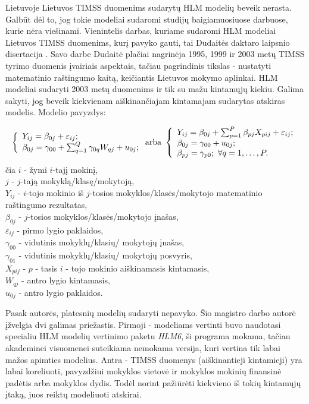\documentclass[11pt,a4paper]{article}
\begin{document}
\indent Lietuvoje Lietuvos TIMSS duomenims sudarytų HLM modelių beveik nerasta. Galbūt dėl to, jog tokie modeliai sudaromi studijų baigiamuosiuose darbuose, kurie nėra viešinami. Vienintelis darbas, kuriame sudaromi HLM modeliai Lietuvos TIMSS duomenims, kurį pavyko gauti, tai Dudaitės daktaro laipsnio disertacija \cite{liet2003}. Savo darbe Dudaitė plačiai nagrinėja 1995, 1999 ir 2003 metų TIMSS tyrimo duomenis įvairiais aspektais, tačiau pagrindinis tikslas - nustatyti matematinio raštingumo kaitą, keičiantis Lietuvos mokymo aplinkai. HLM modeliai sudaryti 2003 metų duomenims ir tik su mažu kintamųjų kiekiu. Galima sakyti, jog beveik kiekvienam aiškinančiajam kintamajam sudarytas atskiras modelis. Modelio pavyzdys:
\begin{small}
\[
\left\{
\begin{array}{l l}
Y_{ij} = \beta_{0j}+\varepsilon_{ij}; \\
\beta_{0j} = \gamma_{00} + \sum^Q_{q=1}\gamma_{0q}W_{qj}+u_{0j};
\end{array} \right.
\text{arba}\
\left\{
\begin{array}{l l}
Y_{ij} = \beta_{0j}+\sum^P_{p=1}\beta_{pj}X_{pij}+\varepsilon_{ij}; \\
\beta_{0j} = \gamma_{00} + u_{0j};\\
\beta_{pj} = \gamma_{p0}; \ \forall q=1,\dots,P.
\end{array} \right.
\]
čia $i$ - žymi $i$-tajį mokinį,\\
$j$ - $j$-tają mokyklą/klasę/mokytoją,\\
$Y_{ij}$ - $i$-tojo mokinio iš $j$-tosios mokyklos/klasės/mokytojo matematinio raštingumo rezultatas,\\
$\beta_{0j}$ - $j$-tosios mokyklos/klasės/mokytojo įnašas,\\
$\varepsilon_{ij}$ - pirmo lygio paklaidos,\\
$\gamma_{00}$ - vidutinis mokyklų/klasių/ mokytojų įnašas,\\
$\gamma_{01}$ - vidutinis mokyklų/klasių/ mokytojų posvyris,\\
$X_{pij}$ - $p$ - tasis $i$ - tojo mokinio aiškinamasis kintamasis,\\
$W_{qj}$ - antro lygio kintamasis, \\
$u_{0j}$ - antro lygio paklaidos.
\end{small}

\indent Pasak autorės, platesnių modelių sudaryti nepavyko. Šio magistro darbo autorė įžvelgia dvi galimas priežastis. Pirmoji - modeliams vertinti buvo naudotasi specialiu HLM modelių vertinimo paketu \textit{HLM6}, ši programa mokama, tačiau akademinei visuomenei suteikiama nemokama versija, kuri vertina tik labai mažos apimties modelius. Antra - TIMSS duomenys (aiškinantieji kintamieji) yra labai koreliuoti, pavyzdžiui mokyklos vietovė ir mokyklos mokinių finansinė padėtis arba mokyklos dydis. Todėl norint pažiūrėti kiekvieno iš tokių kintamųjų įtaką, juos reiktų modeliuoti atskirai.
\end{document}
